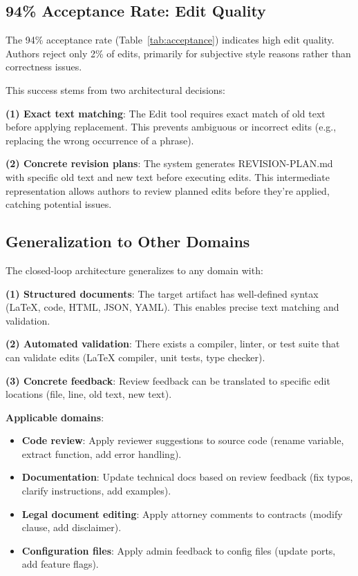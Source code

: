 \subsection{94\% Acceptance Rate: Edit Quality}

The 94\% acceptance rate (Table~\ref{tab:acceptance}) indicates high edit quality. Authors reject only 2\% of edits, primarily for subjective style reasons rather than correctness issues.

This success stems from two architectural decisions:

\textbf{(1) Exact text matching}: The Edit tool requires exact match of old text before applying replacement. This prevents ambiguous or incorrect edits (e.g., replacing the wrong occurrence of a phrase).

\textbf{(2) Concrete revision plans}: The system generates REVISION-PLAN.md with specific old text and new text before executing edits. This intermediate representation allows authors to review planned edits before they're applied, catching potential issues.

\subsection{Generalization to Other Domains}

The closed-loop architecture generalizes to any domain with:

\textbf{(1) Structured documents}: The target artifact has well-defined syntax (LaTeX, code, HTML, JSON, YAML). This enables precise text matching and validation.

\textbf{(2) Automated validation}: There exists a compiler, linter, or test suite that can validate edits (LaTeX compiler, unit tests, type checker).

\textbf{(3) Concrete feedback}: Review feedback can be translated to specific edit locations (file, line, old text, new text).

\textbf{Applicable domains}:
\begin{itemize}
\item \textbf{Code review}: Apply reviewer suggestions to source code (rename variable, extract function, add error handling).
\item \textbf{Documentation}: Update technical docs based on review feedback (fix typos, clarify instructions, add examples).
\item \textbf{Legal document editing}: Apply attorney comments to contracts (modify clause, add disclaimer).
\item \textbf{Configuration files}: Apply admin feedback to config files (update ports, add feature flags).
\end{itemize}

